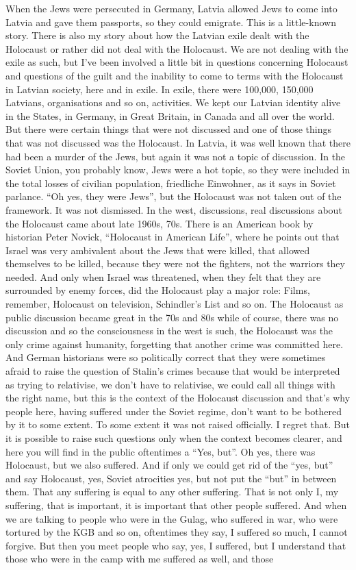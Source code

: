 When the Jews were persecuted in Germany, Latvia allowed Jews to come into Latvia and gave them passports, so they could emigrate. This is a little-known story. There is also my story about how the Latvian exile dealt with the Holocaust or rather did not deal with the Holocaust. We are not dealing with the exile as such, but I've been involved a little bit in questions concerning Holocaust and questions of the guilt and the inability to come to terms with the Holocaust in Latvian society, here and in exile. In exile, there were 100,000, 150,000 Latvians, organisations and so on, activities. We kept our Latvian identity alive in the States, in Germany, in Great Britain, in Canada and all over the world. But there were certain things that were not discussed and one of those things that was not discussed was the Holocaust. In Latvia, it was well known that there had been a murder of the Jews, but again it was not a topic of discussion. In the Soviet Union, you probably know, Jews were a hot topic, so they were included in the total losses of civilian population, friedliche Einwohner, as it says in Soviet parlance. ``Oh yes, they were Jews'', but the Holocaust was not taken out of the framework. It was not dismissed. In the west, discussions, real discussions about the Holocaust came about late 1960s, 70s. There is an American book by historian Peter Novick, ``Holocaust in American Life'', where he points out that Israel was very ambivalent about the Jews that were killed, that allowed themselves to be killed, because they were not the fighters, not the warriors they needed. And only when Israel was threatened, when they felt that they are surrounded by enemy forces, did the Holocaust play a major role: Films, remember, Holocaust on television, Schindler's List and so on. The Holocaust as public discussion became great in the 70s and 80s while of course, there was no discussion and so the consciousness in the west is such, the Holocaust was the only crime against humanity, forgetting that another crime was committed here. And German historians were so politically correct that they were sometimes afraid to raise the question of Stalin's crimes because that would be interpreted as trying to relativise, we don’t have to relativise, we could call all things with the right name, but this is the context of the Holocaust discussion and that's why people here, having suffered under the Soviet regime, don't want to be bothered by it to some extent. To some extent it was not raised officially. I regret that. But it is possible to raise such questions only when the context becomes clearer, and here you will find in the public oftentimes a ``Yes, but''. Oh yes, there was Holocaust, but we also suffered. And if only we could get rid of the ``yes, but'' and say Holocaust, yes, Soviet atrocities yes, but not put the ``but'' in between them. That any suffering is equal to any other suffering. That is not only I, my suffering, that is important, it is important that other people suffered. And when we are talking to people who were in the Gulag, who suffered in war, who were tortured by the KGB and so on, oftentimes they say, I suffered so much, I cannot forgive. But then you meet people who say, yes, I suffered, but I understand that those who were in the camp with me suffered as well, and those 